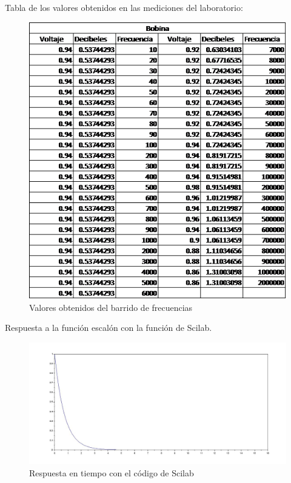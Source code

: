 \documentclass[12pt,letterpaper]{article}     %
\begin{document}
Tabla de los valores obtenidos en las mediciones del laboratorio:
\begin{figure}[h!]
\centering
\includegraphics[width=5in]{Tab}
\caption{Valores obtenidos del barrido de frecuencias}
\end{figure}

\newpage
Respuesta a la función escalón con la función de Scilab.
\begin{figure}[h!]
\centering
\includegraphics[width=5in]{G}
\caption{Respuesta en tiempo con el código de Scilab}
\end{figure}
\end{document}

